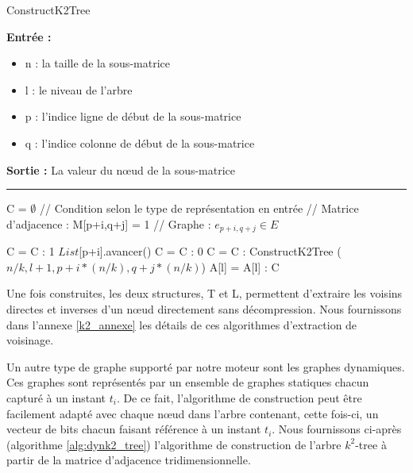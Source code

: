 \documentclass[a4paper,oneside,12pt]{report}
\theoremstyle{definition}
\begin{document}
					\begin{algorithm}[H]
					\label{alg:k2_tree}
					\caption{ConstructK2Tree}
					\textbf{Entrée :}
						\begin{itemize}[label=$\bullet$]
							\item n : la taille de la sous-matrice
							\item l : le niveau de l'arbre
							\item p : l'indice ligne de début de la sous-matrice
							\item q : l'indice colonne de début de la sous-matrice
						\end{itemize}
					\textbf{Sortie :} La valeur du nœud de la sous-matrice\\							\noindent\rule{\textwidth}{1pt}
						
						
				\begin{algorithmic} [1]
					\STATE C = $ \emptyset$
								\STATE // Condition selon le type de représentation en entrée 
								\STATE // Matrice d'adjacence : M[p+i,q+j] = 1 
								\STATE // Graphe : $e_{p+i,q+j} \in E$
								
									\STATE C = C : 1
									\STATE $List$[p+i].avancer()
								\ELSE
									\STATE C = C : 0
								\ENDIF
							\ELSE
								\STATE  C = C : ConstructK2Tree ( $n/k,l+1,p+i*(n/k), q+j*(n/k)$)
							\ENDIF
						\ENDFOR
					\ENDFOR
					\ENDIF
					\STATE A[l] = A[l] : C
				\end{algorithmic}
			\end{algorithm}
	
	\newpage		
		Une fois construites, les deux structures, T et L, permettent d'extraire les voisins directes et inverses d'un nœud directement sans décompression. Nous fournissons dans l'annexe \ref{k2_annexe} les détails de ces  algorithmes d'extraction de voisinage.		
			
	

	Un autre type de graphe supporté par notre moteur sont les graphes dynamiques. Ces graphes sont représentés par un ensemble de graphes statiques chacun capturé à un instant $t_i$. De ce fait, l'algorithme de construction peut être facilement adapté avec chaque nœud dans l'arbre contenant, cette fois-ci, un vecteur de bits chacun faisant référence à un instant $t_i$. Nous fournissons ci-après (algorithme \ref{alg:dynk2_tree}) l'algorithme de construction de l'arbre $k^2$-tree à partir de la matrice d'adjacence tridimensionnelle.\\
	
\end{document}
